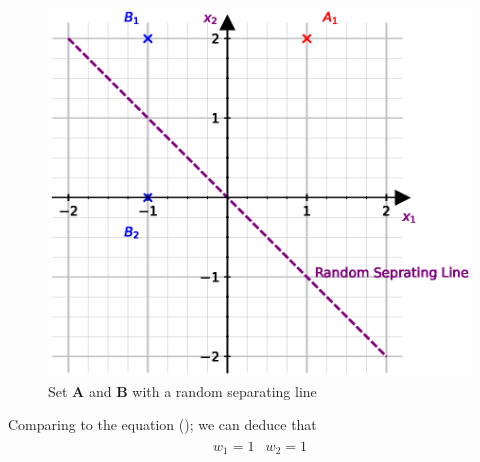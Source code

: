 \begin{figure}[H]
  \centering
  \includegraphics[scale=0.75]{CHAPTER_2/c2_fig_perceptron_example_2_python.eps}
  \caption{Set $\mathbf{A}$ and $\mathbf{B}$ with a random separating line}
  \label{fig:perceptron_example_2}
\end{figure}
\noindent Comparing to the equation (); we can deduce that 
\begin{align}
  \begin{matrix}
    w_1 = 1 & w_2 = 1
  \end{matrix}
\end{align}
